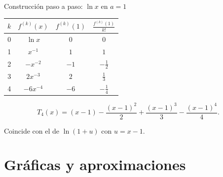 \documentclass[10pt,aspectratio=169]{beamer}
\begin{document}
\begin{frame}{Construcción paso a paso: $\ln x$ en $a=1$}
  \begin{ejemplo}[1]
    \begin{center}
      \renewcommand{\arraystretch}{1.3}
      \begin{tabular}{c|c|c|c}
        $k$ & $f^{(k)}(x)$ & $f^{(k)}(1)$ & $\frac{f^{(k)}(1)}{k!}$\\ \hline
        0 & $\ln x$ & $0$ & $0$\\
        1 & $x^{-1}$ & $1$ & $1$\\
        2 & $-x^{-2}$ & $-1$ & $-\frac12$\\
        3 & $2x^{-3}$ & $2$ & $\frac13$\\
        4 & $-6x^{-4}$ & $-6$ & $-\frac14$
      \end{tabular}
    \end{center}
    \[ T_4(x)=(x-1)-\frac{(x-1)^2}{2}+\frac{(x-1)^3}{3}-\frac{(x-1)^4}{4}. \]
  \end{ejemplo}
  \small Coincide con el de $\ln(1+u)$ con $u=x-1$.
\end{frame}

\section{Gráficas y aproximaciones}
\end{document}
